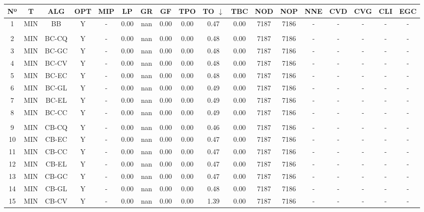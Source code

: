 {
\footnotesize\centering
\hspace*{-5mm}\begin{tabular}{ *{17}{c|} c }
\hline
\textbf{Nº} & \textbf{T} & \textbf{ALG} & \textbf{OPT} & \textbf{MIP} & \textbf{LP} & \textbf{GR} & \textbf{GF} & \textbf{TPO} & \textbf{TO} $\downarrow$ & \textbf{TBC} & \textbf{NOD} & \textbf{NOP} & \textbf{NNE} & \textbf{CVD} & \textbf{CVG} & \textbf{CLI} & \textbf{EGC}\\
\hline
1 & MIN & BB & Y & - & 0.00 & nan & 0.00 & 0.00 & 0.47 & 0.00 & 7187 & 7186 & - & - & - & - & -\\
\hline
\multicolumn{18}{c}{}
\\
\hline
2 & MIN & BC-CQ & Y & - & 0.00 & nan & 0.00 & 0.00 & 0.48 & 0.00 & 7187 & 7186 & - & - & - & - & -\\
\hline
3 & MIN & BC-GC & Y & - & 0.00 & nan & 0.00 & 0.00 & 0.48 & 0.00 & 7187 & 7186 & - & - & - & - & -\\
\hline
4 & MIN & BC-CV & Y & - & 0.00 & nan & 0.00 & 0.00 & 0.48 & 0.00 & 7187 & 7186 & - & - & - & - & -\\
\hline
5 & MIN & BC-EC & Y & - & 0.00 & nan & 0.00 & 0.00 & 0.48 & 0.00 & 7187 & 7186 & - & - & - & - & -\\
\hline
6 & MIN & BC-GL & Y & - & 0.00 & nan & 0.00 & 0.00 & 0.49 & 0.00 & 7187 & 7186 & - & - & - & - & -\\
\hline
7 & MIN & BC-EL & Y & - & 0.00 & nan & 0.00 & 0.00 & 0.49 & 0.00 & 7187 & 7186 & - & - & - & - & -\\
\hline
8 & MIN & BC-CC & Y & - & 0.00 & nan & 0.00 & 0.00 & 0.49 & 0.00 & 7187 & 7186 & - & - & - & - & -\\
\hline
\multicolumn{18}{c}{}
\\
\hline
9 & MIN & CB-CQ & Y & - & 0.00 & nan & 0.00 & 0.00 & 0.46 & 0.00 & 7187 & 7186 & - & - & - & - & -\\
\hline
10 & MIN & CB-EC & Y & - & 0.00 & nan & 0.00 & 0.00 & 0.47 & 0.00 & 7187 & 7186 & - & - & - & - & -\\
\hline
11 & MIN & CB-CC & Y & - & 0.00 & nan & 0.00 & 0.00 & 0.47 & 0.00 & 7187 & 7186 & - & - & - & - & -\\
\hline
12 & MIN & CB-EL & Y & - & 0.00 & nan & 0.00 & 0.00 & 0.47 & 0.00 & 7187 & 7186 & - & - & - & - & -\\
\hline
13 & MIN & CB-GC & Y & - & 0.00 & nan & 0.00 & 0.00 & 0.47 & 0.00 & 7187 & 7186 & - & - & - & - & -\\
\hline
14 & MIN & CB-GL & Y & - & 0.00 & nan & 0.00 & 0.00 & 0.48 & 0.00 & 7187 & 7186 & - & - & - & - & -\\
\hline
15 & MIN & CB-CV & Y & - & 0.00 & nan & 0.00 & 0.00 & 1.39 & 0.00 & 7187 & 7186 & - & - & - & - & -\\
\hline
\end{tabular}\\
\vspace{4mm}
}

